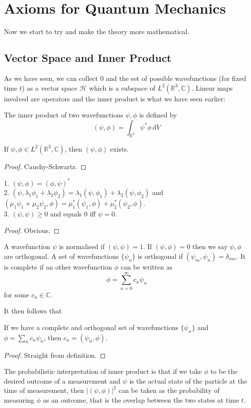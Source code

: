 \section{Axioms for Quantum Mechanics}
Now we start to try and make the theory more mathematical.
\subsection{Vector Space and Inner Product}
As we have seen, we can collect $0$ and the set of possible wavefunctions (for fixed time $t$) as a vector space $\mathcal H$ which is a subspace of $L^2(\mathbb R^3,\mathbb C)$.
Linear maps involved are operators and the inner product is what we have seen earlier:
\begin{definition}
    The inner product of two wavefunctions $\psi,\phi$ is defined by
    $$(\psi,\phi)=\int_{\mathbb R^3}\psi^*\phi\,\mathrm dV$$
\end{definition}
\begin{lemma}
    If $\psi,\phi\in L^2(\mathbb R^3,\mathbb C)$, then $(\psi,\phi)$ exists.
\end{lemma}
\begin{proof}
    Cauchy-Schwartz.
\end{proof}
\begin{proposition}
    1. $(\psi,\phi)=(\phi,\psi)^*$\\
    2. $(\psi,\lambda_1\phi_1+\lambda_2\phi_2)=\lambda_1(\psi,\phi_1)+\lambda_2(\psi,\phi_2)$ and $(\mu_1\psi_1+\mu_2\psi_2,\phi)=\mu_1^*(\psi_1,\phi)+\mu_2^*(\psi_2,\phi)$.\\
    3. $( \psi,\psi)\ge 0$ and equals $0$ iff $\psi=0$.
\end{proposition}
\begin{proof}
    Obvious.
\end{proof}
\begin{definition}
    A wavefunction $\psi$ is normalised if $(\psi,\psi)=1$.
    If $(\psi,\phi)=0$ then we say $\psi,\phi$ are orthogonal.
    A set of wavefunctions $\{\psi_n\}$ is orthogonal if $(\psi_m,\psi_n)=\delta_{mn}$.
    It is complete if an other wavefunction $\phi$ can be written as
    $$\phi=\sum_{n=0}^\infty c_n\psi_n$$
    for some $c_n\in\mathbb C$.
\end{definition}
It then follows that
\begin{proposition}
    If we have a complete and orthogonal set of wavefunctions $\{\psi_n\}$ and $\phi=\sum_n c_n\psi_n$, then $c_n=(\psi_n,\phi)$.
\end{proposition}
\begin{proof}
    Straight from definition.
\end{proof}
The probabilistic interpretation of inner product is that if we take $\phi$ to be the desired outcome of a measurement and $\psi$ is the actual state of the particle at the time of measurement, then $|( \psi,\phi)|^2$ can be taken as the probability of measuring $\phi$ as an outcome, that is the overlap between the two states at time $t$.
